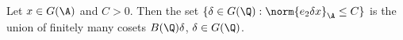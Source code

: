 Let $x\in G(\A)$ and $C>0$. Then the set $\{\delta\in G(\Q):\norm{e_2\delta x}_\A\le C\}$ is the union of finitely many
cosets $B(\Q)\delta$, $\delta\in G(\Q)$.
